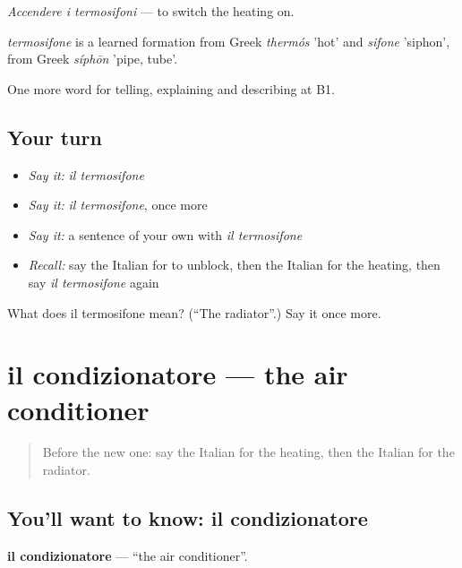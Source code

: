 \emph{Accendere i termosifoni} — to switch the heating on.

\begin{cousinweb}
\emph{termosifone} is a learned formation from Greek \emph{thermós} 'hot' and \emph{sifone} 'siphon', from Greek \emph{síphōn} 'pipe, tube'.
\end{cousinweb}

\begin{grammarlens}[title={What you've built}]
One more word for telling, explaining and describing at B1.
\end{grammarlens}

\subsection*{Your turn}
\begin{itemize}
\raggedright
  \item \emph{Say it:} \emph{il termosifone}
  \item \emph{Say it:} \emph{il termosifone}, once more
  \item \emph{Say it:} a sentence of your own with \emph{il termosifone}
  \item \emph{Recall:} say the Italian for to unblock, then the Italian for the heating, then say \emph{il termosifone} again
\end{itemize}

\begin{tcolorbox}[breakable,colback=teal!4,colframe=teal!35!black,title={Before you move on}]
What does il termosifone mean? (\textquotedblleft{}The radiator\textquotedblright{}.) Say it once more.
\end{tcolorbox}
\section[il condizionatore]{il condizionatore — the air conditioner}

\label{lesson:IT-C435-condizionatore}



\begin{quote}
Before the new one: say the Italian for the heating, then the Italian for the radiator.
\end{quote}

\subsection*{You'll want to know: il condizionatore}
\textbf{il condizionatore} — \textquotedblleft{}the air conditioner\textquotedblright{}.

